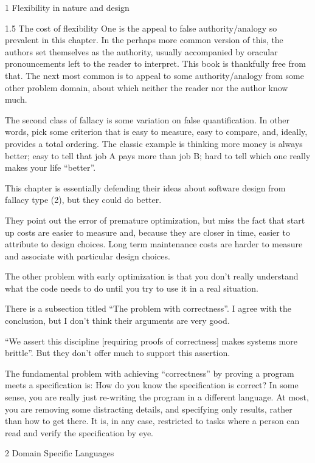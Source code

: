 \documentclass[11pt]{PalisadesLakesBook}
\begin{document}
\begin{plSection}{}
\begin{plSection}{1 Flexibility in nature and design}
\begin{plSection}{1.5 The cost of flexibility}
One is the appeal to false authority/analogy so prevalent in this 
chapter. 
In the perhaps more common version of this, the authors set 
themselves as the authority, 
usually accompanied by oracular pronouncements left to the reader
to interpret.
This book is thankfully free from that.
The next most common is to appeal to some authority/analogy
from some other problem domain, about which 
neither the reader nor the author know much.

The second class of fallacy is some variation on false 
quantification. 
In other words, pick some criterion that is
easy to measure, easy to compare, and, ideally,
provides a total ordering. 
The classic example is thinking more money is always better;
easy to tell that job A pays more than job B;
hard to tell which one really makes your life ``better''.

This chapter is essentially defending their ideas about software
design from fallacy type (2),
but they could do better.

They point out the error of premature optimization,
but miss the fact that start up costs are easier to measure
and, because they are closer in time, easier to attribute to
design choices. 
Long term maintenance costs are harder to measure and
associate with particular design choices.

The other problem with early optimization is that you don't
really understand what the code needs to do until you try to
use it in a real situation.

There is a subsection titled ``The problem with correctness''.
I agree with the conclusion, but I don't think their arguments
are very good.

``We assert this discipline [requiring proofs of correctness]
makes systems more brittle''.
But they don't offer much to support this assertion.

The fundamental problem with achieving ``correctness''
by proving a program meets a specification is:
How do you know the specification is correct?
In some sense, you are really just re-writing the program
in a different language.
At most, you are removing some distracting details,
and specifying only results, rather than how to get there.
It is, in any case, restricted to tasks  where a person can
read and verify the specification by eye.

\end{plSection}%
\end{plSection}%
\begin{plSection}{2 Domain Specific Languages}


\end{plSection}
\end{plSection}
\end{document}
